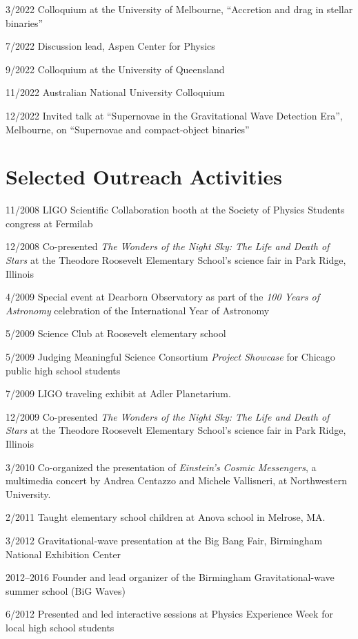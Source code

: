 \documentclass[margin,line]{res}
\begin{document}
\begin{resume}
3/2022 Colloquium at the University of Melbourne, ``Accretion and drag in stellar binaries'' 

7/2022 Discussion lead, Aspen Center for Physics

9/2022 Colloquium at the University of Queensland

11/2022 Australian National University Colloquium

12/2022	Invited talk at ``Supernovae in the Gravitational Wave Detection Era'', Melbourne, on ``Supernovae and compact-object binaries''


\newpage

\section{\sc Selected Outreach Activities}
11/2008 	LIGO Scientific Collaboration booth at the Society of Physics Students congress at Fermilab

12/2008 	Co-presented {\it The Wonders of the Night Sky: The Life and Death of Stars} at the Theodore Roosevelt Elementary School's science fair in Park Ridge, Illinois

4/2009 	Special event at Dearborn Observatory as part of the {\it 100 Years of Astronomy} celebration of the International Year of Astronomy

5/2009	Science Club at Roosevelt elementary school

5/2009	Judging Meaningful Science Consortium {\it Project Showcase} for Chicago public high school students

7/2009 	 LIGO traveling exhibit at Adler Planetarium. 

12/2009 	Co-presented {\it The Wonders of the Night Sky: The Life and Death of Stars} at the Theodore Roosevelt Elementary School's science fair in Park Ridge, Illinois

3/2010  	Co-organized the presentation of {\it Einstein's Cosmic Messengers}, a multimedia concert by Andrea Centazzo and Michele Vallisneri, at Northwestern University.

2/2011	Taught elementary school children at Anova school in Melrose, MA.

3/2012	Gravitational-wave presentation at the Big Bang Fair, Birmingham National Exhibition Center

2012--2016	Founder and lead organizer of the Birmingham Gravitational-wave summer school (BiG Waves)

6/2012	Presented and led interactive sessions at Physics Experience Week for local high school students


\end{resume}
\end{document}
